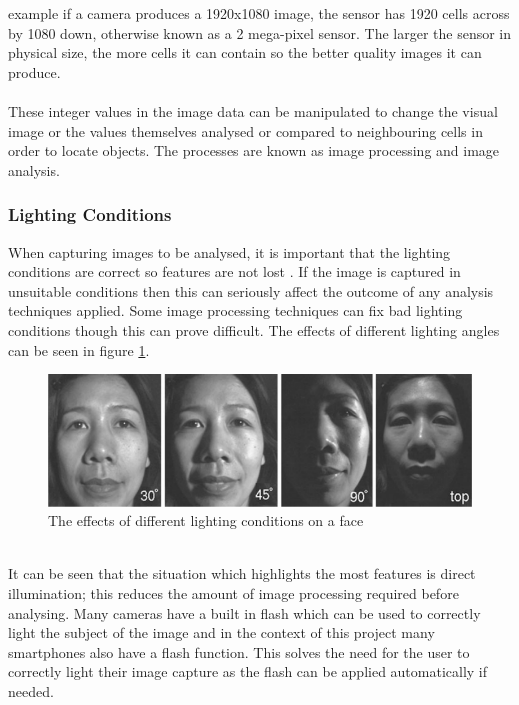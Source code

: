 	example if a camera produces a 1920x1080 image, the sensor has 1920 cells across by 1080 down, otherwise known as a 2 mega-pixel sensor. The larger the sensor in physical size, the more cells it can contain so the better quality images it can produce.
	\\\\
	These integer values in the image data can be manipulated to change the 
	visual image or the values themselves analysed or compared to neighbouring 
	cells in order to locate objects. The processes are known as image processing and image analysis.
	\subsubsection{Lighting Conditions}
	When capturing images to be analysed, it is important that the lighting conditions are correct so features are not lost \citep{introtoprocessing}. If the image is captured in unsuitable conditions then this can seriously affect the outcome of any analysis techniques applied. Some image processing techniques can fix bad lighting conditions though this can prove difficult. The effects of different lighting angles can be seen in figure \ref{fig:illumination}.
	\begin{figure}[h!]
		\centering
		\includegraphics[width=\linewidth]{../images/face_illumination.png}
		\caption[]{The effects of different lighting conditions on a face \citep{introtoprocessing}}
		\label{fig:illumination}
	\end{figure}\\
	It can be seen that the situation which highlights the most features is direct illumination; this reduces the amount of image processing required before analysing. Many cameras have a built in flash which can be used to correctly light the subject of the image and in the context of this project many smartphones also have a flash function. This solves the need for the user to correctly light their image capture as the flash can be applied automatically if needed.
